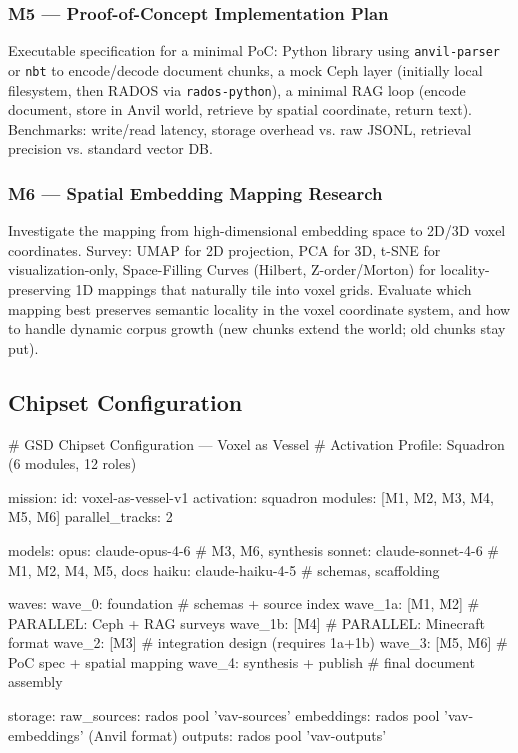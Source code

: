 \documentclass[11pt,letterpaper]{article}
\begin{document}
\subsubsection{M5 --- Proof-of-Concept Implementation Plan}
Executable specification for a minimal PoC: Python library using \texttt{anvil-parser} or \texttt{nbt} to encode/decode document chunks, a mock Ceph layer (initially local filesystem, then RADOS via \texttt{rados-python}), a minimal RAG loop (encode document, store in Anvil world, retrieve by spatial coordinate, return text). Benchmarks: write/read latency, storage overhead vs. raw JSONL, retrieval precision vs. standard vector DB.

\subsubsection{M6 --- Spatial Embedding Mapping Research}
Investigate the mapping from high-dimensional embedding space to 2D/3D voxel coordinates. Survey: UMAP for 2D projection, PCA for 3D, t-SNE for visualization-only, Space-Filling Curves (Hilbert, Z-order/Morton) for locality-preserving 1D mappings that naturally tile into voxel grids. Evaluate which mapping best preserves semantic locality in the voxel coordinate system, and how to handle dynamic corpus growth (new chunks extend the world; old chunks stay put).

\subsection{Chipset Configuration}

\begin{asciibox}
# GSD Chipset Configuration --- Voxel as Vessel
# Activation Profile: Squadron (6 modules, 12 roles)

mission:
  id: voxel-as-vessel-v1
  activation: squadron
  modules: [M1, M2, M3, M4, M5, M6]
  parallel_tracks: 2

models:
  opus:    claude-opus-4-6      # M3, M6, synthesis
  sonnet:  claude-sonnet-4-6    # M1, M2, M4, M5, docs
  haiku:   claude-haiku-4-5     # schemas, scaffolding

waves:
  wave_0:  foundation           # schemas + source index
  wave_1a: [M1, M2]             # PARALLEL: Ceph + RAG surveys
  wave_1b: [M4]                 # PARALLEL: Minecraft format
  wave_2:  [M3]                 # integration design (requires 1a+1b)
  wave_3:  [M5, M6]             # PoC spec + spatial mapping
  wave_4:  synthesis + publish  # final document assembly

storage:
  raw_sources:   rados pool 'vav-sources'
  embeddings:    rados pool 'vav-embeddings' (Anvil format)
  outputs:       rados pool 'vav-outputs'
\end{asciibox}
\end{document}
